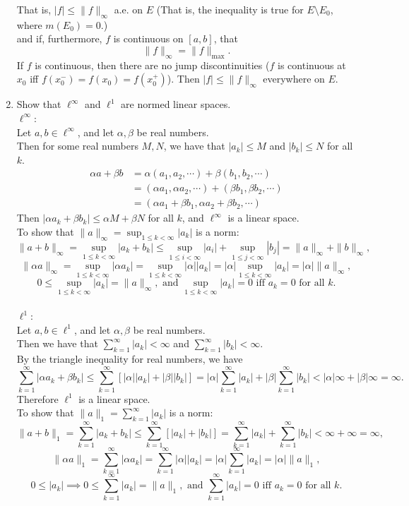 \begin{enumerate}
	That is, $|f|\le\|f\|_\infty$ a.e. on $E$ (That is, the inequality is true for $E\setminus E_0$, where $m(E_0)=0$.)
	\\
	and if, furthermore, $f$ is continuous on $[a,b]$, that
	\[
	\| f \|_{\infty} = \| f \|_{\max}.	
	\]
	If $f$ is continuous, then there are no jump discontinuities ($f$ is continuous at $x_0$ iff $f(x_0^-)=f(x_0)=f(x_0^+)$).
	Then $|f|\le\|f\|_\infty$ everywhere on $E$.
	\item Show that $\ell^\infty$ and $\ell^1$ are normed linear spaces.\\
	$\ell^\infty$:\\
	Let $a,b \in \ell^\infty$, and let $\alpha , \beta$ be real numbers.\\
	Then for some real numbers $M,N$, we have that $|a_k|\le M$ and $|b_k|\le N$ for all $k$.
	\begin{align*}
		\alpha a + \beta b &= \alpha (a_1,a_2,\cdots)+ \beta (b_1,b_2,\cdots)\\		
		&= (\alpha a_1,\alpha a_2,\cdots)+ (\beta b_1,\beta b_2,\cdots)\\
		&= (\alpha a_1+\beta b_1,\alpha a_2+\beta b_2,\cdots)
	\end{align*}
	Then $|\alpha a_k+\beta b_k|\le \alpha M + \beta N$ for all $k$, and $\ell^\infty$ is a linear space.\\
	To show that $\|a\|_\infty = \sup_{1\le k<\infty}|a_k|$ is a norm:
	\[
		\|a+b\|_\infty = \sup_{1\le k<\infty}|a_k+b_k|\le \sup_{1\le i<\infty}|a_i| + \sup_{1\le j<\infty}|b_j| = \|a\|_\infty + \|b\|_\infty,
	\]
	\[
		\|\alpha a\|_\infty = \sup_{1\le k<\infty}|\alpha a_k| = \sup_{1\le k<\infty}|\alpha|| a_k|= |\alpha|\sup_{1\le k<\infty}| a_k|=|\alpha|\|a\|_\infty, 
	\]
	\[
		0 \le \sup_{1\le k<\infty}| a_k| = \|a\|_\infty,\text{ and }\sup_{1\le k<\infty}| a_k|=0\text{ iff }a_k=0\text{ for all }k.	
	\]
	\\
	$\ell^1$:\\
	Let $a,b \in \ell^1$, and let $\alpha , \beta$ be real numbers.\\
	Then we have that $\sum_{k=1}^\infty|a_k|<\infty$ and $\sum_{k=1}^\infty|b_k|<\infty$.\\
	By the triangle inequality for real numbers, we have
	\[
		\sum_{k=1}^\infty |\alpha a_k + \beta b_k| \le\sum_{k=1}^\infty[ |\alpha|| a_k| + | \beta ||b_k|]= |\alpha|\sum_{k=1}^\infty | a_k| + |\beta |\sum_{k=1}^\infty |b_k| <|\alpha|\infty+|\beta|\infty = \infty.
	\]
	Therefore $\ell^1$ is a linear space.\\
	To show that $\|a\|_1 = \sum_{k=1}^\infty|a_k|$ is a norm:
	\[
		\|a+b\|_1 = \sum_{k=1}^\infty|a_k+b_k|\le\sum_{k=1}^\infty[|a_k|+|b_k|]=\sum_{k=1}^\infty|a_k|+\sum_{k=1}^\infty|b_k|<\infty +\infty = \infty,
	\]
	\[
		\|\alpha a\|_1 = \sum_{k=1}^\infty|\alpha a_k| = \sum_{k=1}^\infty|\alpha|| a_k|=|\alpha|\sum_{k=1}^\infty| a_k|=|\alpha|\|a\|_1, 
	\]
	\[
		0 \le | a_k| \implies 0 \le \sum_{k=1}^\infty |a_k| = \|a\|_1,\text{ and }\sum_{k=1}^\infty| a_k|=0\text{ iff }a_k=0\text{ for all }k.	
	\]
\end{enumerate}

